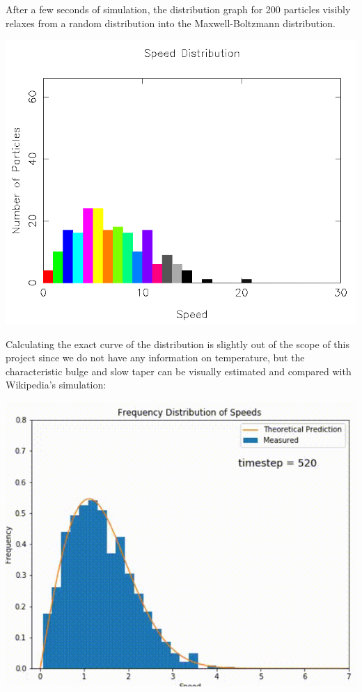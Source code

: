 \documentclass{article}
\begin{document}
After a few seconds of simulation, the distribution graph for 200 particles visibly relaxes from a random distribution
into the Maxwell-Boltzmann distribution.
\\
\begin{center}
    \includegraphics[scale=0.5]{uncharged_random_dist}
\end{center}

Calculating the exact curve of the distribution is slightly out of the scope of this project
since we do not have any information on temperature,
but the characteristic bulge and slow taper can be visually estimated and compared with Wikipedia's simulation:
\\
\begin{center}
    \includegraphics[scale=0.5]{mb_wiki}
\end{center}
\end{document}
